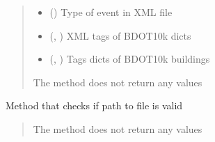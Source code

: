 \documentclass[letterpaper,10pt,english]{sphinxmanual}
\begin{document}
\begin{fulllineitems}
\begin{fulllineitems}
\begin{quote}
\begin{description}
\begin{itemize}
\item {} 
\sphinxAtStartPar
{} () \textendash{} Type of event in XML file

\item {} 
\sphinxAtStartPar
{} (\sphinxcode{\sphinxupquote{Dict}}{[}, \sphinxcode{\sphinxupquote{str}}{]}) \textendash{} XML tags of BDOT10k dicts

\item {} 
\sphinxAtStartPar
{} (\sphinxcode{\sphinxupquote{Dict}}{[}, \sphinxcode{\sphinxupquote{int}}{]}) \textendash{} Tags dicts of BDOT10k buildings

\end{itemize}

\sphinxAtStartPar
The method does not return any values

\end{description}\end{quote}

\end{fulllineitems}


\begin{fulllineitems}
\label{\detokenize{xml_parsers:xml_parsers.BDOT10kDataParser.check_path}}
\pysigstartsignatures
{}
\pysigstopsignatures
\sphinxAtStartPar
Method that checks if path to file is valid
\begin{quote}\begin{description}
\sphinxAtStartPar
{}

\sphinxAtStartPar
The method does not return any values

\end{description}\end{quote}

\end{fulllineitems}



\end{fulllineitems}
\end{document}
